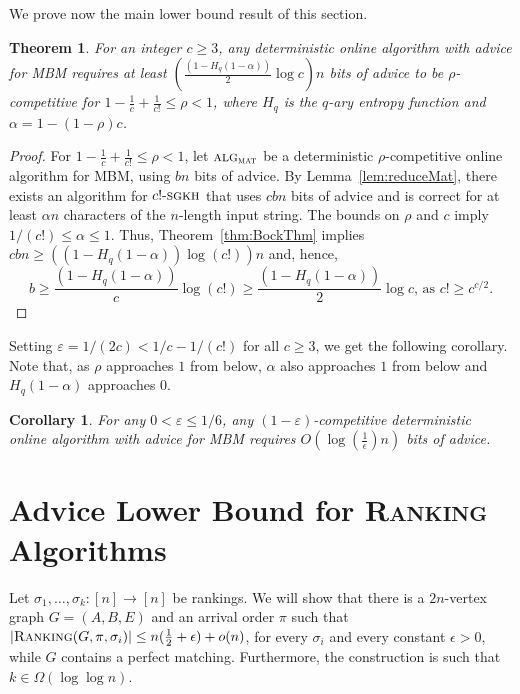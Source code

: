 \documentclass[a4paper]{article}
\newcommand{\Rank}{\textsc{Ranking}}
\newcommand{\eps}{\varepsilon}
\newcommand{\ALG}{\textsc{alg}}
\newcommand{\alg}{\ALG}
\newcommand{\cStr}{{c!\text{-}\textsc{sgkh}}}
\newcommand{\mat}{\textsc{mat}}
\newcommand{\OO}{\ensuremath{{O}}}
\newtheorem{theorem}{Theorem}
\newtheorem{corollary}{Corollary}
\begin{document}
We prove now the main lower bound result of this section.
\begin{theorem}\label{thm:lbEps}
  For an integer $c \ge 3$, any deterministic online algorithm with advice for \textsc{MBM}
  requires at least $\left(\frac{(1 - H_q(1-\alpha))}{2}\log c\right)n$ bits of advice to be
  $\rho$-competitive for $1 - \frac{1}{c} + \frac{1}{c!} \le \rho < 1$, where $H_q$ is the $q$-ary
  entropy function and $\alpha = 1 - (1 - \rho)c$.
\end{theorem}

\begin{proof}
  For $1 - \frac{1}{c} + \frac{1}{c!} \le \rho < 1$, let $\alg_\mat$ be a deterministic $\rho$-competitive
  online algorithm for \textsc{MBM}, using $bn$ bits of advice.
  By Lemma~\ref{lem:reduceMat}, there exists an algorithm for $\cStr$ that uses
  $cbn$ bits of advice and is correct for at least $\alpha n$ characters of the $n$-length
  input string. The bounds on $\rho$ and $c$ imply
  $1/(c!) \le \alpha \le 1$. Thus, Theorem~\ref{thm:BockThm} implies
  $cbn \ge ((1 - H_q(1-\alpha))\log (c!) )n$ and, hence,
  $$
    b \ge \frac{(1 - H_q(1-\alpha))}{c}\log (c!) \ge \frac{(1 - H_q(1-\alpha))}{2}\log c \text{, as $c! \ge c^{c/2}$.}
  $$
\end{proof}

Setting $\eps = 1/(2c) < 1/c - 1/(c!)$ for all $c \ge 3$, we get the following corollary. Note that,
as $\rho$ approaches $1$ from below, $\alpha$ also approaches $1$ from below and $H_q(1-\alpha)$ approaches $0$.

\begin{corollary} \label{cor:lb-advice}
  For any $0 < \eps \le 1/6$, any $(1 - \eps)$-competitive deterministic online algorithm with advice
  for \textsc{MBM} requires $\OO(\log(\frac{1}{\epsilon}) n)$ bits of advice.
\end{corollary}

\section{Advice Lower Bound for \textsc{Ranking} Algorithms} \label{sec:lb-rank}
Let $\sigma_1, \dots, \sigma_k: [n] \rightarrow [n]$ be rankings.
We will show that there is a $2n$-vertex graph $G = (A, B, E)$ and an arrival order $\pi$ such that
$|\Rank(G, \pi, \sigma_i)| \le n(\frac{1}{2}+\epsilon) + o(n)$, for every $\sigma_i$ and every constant
$\epsilon > 0$, while $G$ contains a perfect matching. Furthermore, the construction is such that
$k \in \Omega (\log \log n)$.
\end{document}
